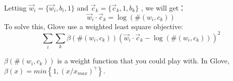 \documentclass{article} %
\begin{document}
Letting $\vec{w}_i = \{\vec{w}_i,b_i,1\}$ and $\vec{c}_k = \{\vec{c}_k,1,b_k\}$ , we will get：
\begin{equation}
\vec{w}_i\cdot\vec{c}_k = \log{(\#(w_i,c_k))}
\end{equation}
To solve this, Glove use a weighted least square objective:
\begin{equation}
\sum\limits_i \sum\limits_k{\beta\left(\#(w_i,c_k)\right){(\vec{w}_i\cdot\vec{c}_k - \log{\left(\#(w_i,c_k)\right)})}^2}
\end{equation}

$\beta(\#(w_i,c_k))$ is a weight function that you could play with. In Glove, $\beta(x)= min\left\{1,{(x/{x_{max}})}^\gamma\right\} $.
\end{document}
